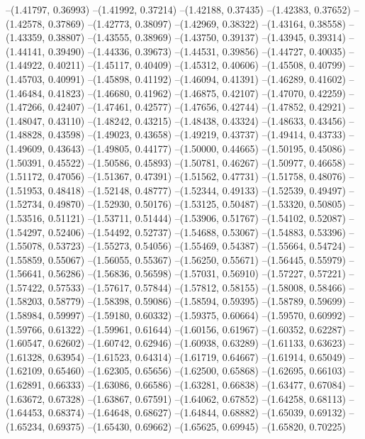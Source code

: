 --(1.41797, 0.36993)
--(1.41992, 0.37214)
--(1.42188, 0.37435)
--(1.42383, 0.37652)
--(1.42578, 0.37869)
--(1.42773, 0.38097)
--(1.42969, 0.38322)
--(1.43164, 0.38558)
--(1.43359, 0.38807)
--(1.43555, 0.38969)
--(1.43750, 0.39137)
--(1.43945, 0.39314)
--(1.44141, 0.39490)
--(1.44336, 0.39673)
--(1.44531, 0.39856)
--(1.44727, 0.40035)
--(1.44922, 0.40211)
--(1.45117, 0.40409)
--(1.45312, 0.40606)
--(1.45508, 0.40799)
--(1.45703, 0.40991)
--(1.45898, 0.41192)
--(1.46094, 0.41391)
--(1.46289, 0.41602)
--(1.46484, 0.41823)
--(1.46680, 0.41962)
--(1.46875, 0.42107)
--(1.47070, 0.42259)
--(1.47266, 0.42407)
--(1.47461, 0.42577)
--(1.47656, 0.42744)
--(1.47852, 0.42921)
--(1.48047, 0.43110)
--(1.48242, 0.43215)
--(1.48438, 0.43324)
--(1.48633, 0.43456)
--(1.48828, 0.43598)
--(1.49023, 0.43658)
--(1.49219, 0.43737)
--(1.49414, 0.43733)
--(1.49609, 0.43643)
--(1.49805, 0.44177)
--(1.50000, 0.44665)
--(1.50195, 0.45086)
--(1.50391, 0.45522)
--(1.50586, 0.45893)
--(1.50781, 0.46267)
--(1.50977, 0.46658)
--(1.51172, 0.47056)
--(1.51367, 0.47391)
--(1.51562, 0.47731)
--(1.51758, 0.48076)
--(1.51953, 0.48418)
--(1.52148, 0.48777)
--(1.52344, 0.49133)
--(1.52539, 0.49497)
--(1.52734, 0.49870)
--(1.52930, 0.50176)
--(1.53125, 0.50487)
--(1.53320, 0.50805)
--(1.53516, 0.51121)
--(1.53711, 0.51444)
--(1.53906, 0.51767)
--(1.54102, 0.52087)
--(1.54297, 0.52406)
--(1.54492, 0.52737)
--(1.54688, 0.53067)
--(1.54883, 0.53396)
--(1.55078, 0.53723)
--(1.55273, 0.54056)
--(1.55469, 0.54387)
--(1.55664, 0.54724)
--(1.55859, 0.55067)
--(1.56055, 0.55367)
--(1.56250, 0.55671)
--(1.56445, 0.55979)
--(1.56641, 0.56286)
--(1.56836, 0.56598)
--(1.57031, 0.56910)
--(1.57227, 0.57221)
--(1.57422, 0.57533)
--(1.57617, 0.57844)
--(1.57812, 0.58155)
--(1.58008, 0.58466)
--(1.58203, 0.58779)
--(1.58398, 0.59086)
--(1.58594, 0.59395)
--(1.58789, 0.59699)
--(1.58984, 0.59997)
--(1.59180, 0.60332)
--(1.59375, 0.60664)
--(1.59570, 0.60992)
--(1.59766, 0.61322)
--(1.59961, 0.61644)
--(1.60156, 0.61967)
--(1.60352, 0.62287)
--(1.60547, 0.62602)
--(1.60742, 0.62946)
--(1.60938, 0.63289)
--(1.61133, 0.63623)
--(1.61328, 0.63954)
--(1.61523, 0.64314)
--(1.61719, 0.64667)
--(1.61914, 0.65049)
--(1.62109, 0.65460)
--(1.62305, 0.65656)
--(1.62500, 0.65868)
--(1.62695, 0.66103)
--(1.62891, 0.66333)
--(1.63086, 0.66586)
--(1.63281, 0.66838)
--(1.63477, 0.67084)
--(1.63672, 0.67328)
--(1.63867, 0.67591)
--(1.64062, 0.67852)
--(1.64258, 0.68113)
--(1.64453, 0.68374)
--(1.64648, 0.68627)
--(1.64844, 0.68882)
--(1.65039, 0.69132)
--(1.65234, 0.69375)
--(1.65430, 0.69662)
--(1.65625, 0.69945)
--(1.65820, 0.70225)
